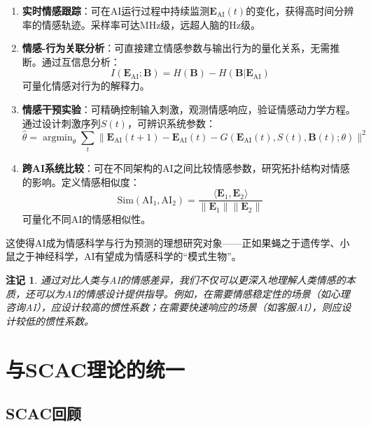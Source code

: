 \documentclass[12pt,a4paper]{article}
\theoremstyle{plain}
\newtheorem{remark}{注记}[section]
\newcommand{\ve}[1]{\bm{#1}}                    %
\newcommand{\Evec}{\ve{E}}                        %
\newcommand{\Bvec}{\ve{B}}                        %
\DeclareMathOperator*{\argmin}{argmin}
\begin{document}
\begin{enumerate}
    \item \textbf{实时情感跟踪}：可在AI运行过程中持续监测$\Evec_{\text{AI}}(t)$的变化，获得高时间分辨率的情感轨迹。采样率可达MHz级，远超人脑的Hz级。
    \item \textbf{情感-行为关联分析}：可直接建立情感参数与输出行为的量化关系，无需推断。通过互信息分析：
    \begin{equation}
    I(\Evec_{\text{AI}}; \Bvec) = H(\Bvec) - H(\Bvec | \Evec_{\text{AI}})
    \end{equation}
    可量化情感对行为的解释力。
    \item \textbf{情感干预实验}：可精确控制输入刺激，观测情感响应，验证情感动力学方程。通过设计刺激序列$S(t)$，可辨识系统参数：
    \begin{equation}
    \hat{\theta} = \argmin_{\theta} \sum_t \| \Evec_{\text{AI}}(t+1) - \Evec_{\text{AI}}(t) - G(\Evec_{\text{AI}}(t), S(t), \Bvec(t); \theta) \|^2
    \end{equation}
    \item \textbf{跨AI系统比较}：可在不同架构的AI之间比较情感参数，研究拓扑结构对情感的影响。定义情感相似度：
    \begin{equation}
    \text{Sim}(\text{AI}_1, \text{AI}_2) = \frac{\langle \Evec_1, \Evec_2 \rangle}{\|\Evec_1\| \|\Evec_2\|}
    \end{equation}
    可量化不同AI的情感相似性。
\end{enumerate}

这使得AI成为情感科学与行为预测的理想研究对象——正如果蝇之于遗传学、小鼠之于神经科学，AI有望成为情感科学的“模式生物”。

\begin{remark}
通过对比人类与AI的情感差异，我们不仅可以更深入地理解人类情感的本质，还可以为AI的情感设计提供指导。例如，在需要情感稳定性的场景（如心理咨询AI），应设计较高的惯性系数；在需要快速响应的场景（如客服AI），则应设计较低的惯性系数。
\end{remark}

\section{与SCAC理论的统一}

\subsection{SCAC回顾}
\end{document}
